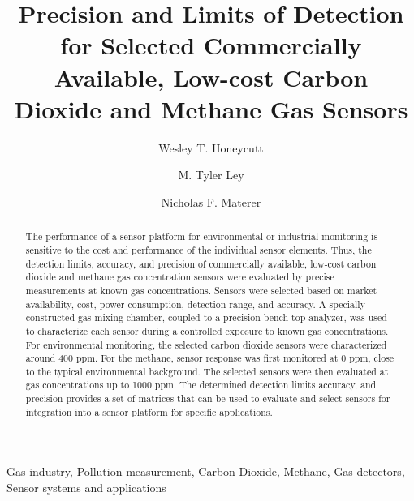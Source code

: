 \documentclass[preprint,sort&compress]{elsarticle}
\begin{document}
	
	\begin{frontmatter}
		\title{Precision and Limits of Detection for Selected Commercially Available, Low-cost Carbon Dioxide and Methane Gas Sensors}
		\author[chm]{Wesley T. Honeycutt}
		
		\author[cve]{M. Tyler Ley}	
		
		\author[chm]{Nicholas F. Materer}
		
		\address[chm]{Oklahoma State University, Department of Chemistry, 107 Physical Sciences, Stillwater, OK 74078, USA}
		\address[cve]{Oklahoma State University, Department of Civil Engineering, 319C Engineering South, Stillwater, OK 74078, USA}
		
		\begin{abstract} 
			
			The performance of a sensor platform for environmental or industrial monitoring is sensitive to the cost and performance of the individual sensor elements.
			Thus, the detection limits, accuracy, and precision of commercially available, low-cost carbon dioxide and methane gas concentration sensors were evaluated by precise measurements at known gas concentrations.
			Sensors were selected based on market availability, cost, power consumption, detection range, and accuracy.
			A specially constructed gas mixing chamber, coupled to a precision bench-top analyzer, was used to characterize each sensor during a controlled exposure to known gas concentrations.
			For environmental monitoring, the selected carbon dioxide sensors were characterized around 400 ppm.
			For the methane, sensor response was first monitored at 0 ppm, close to the typical environmental background.
			The selected sensors were then evaluated at gas concentrations up to 1000 ppm.
			The determined detection limits accuracy, and precision provides a set of matrices that can be used to evaluate and select sensors for integration into a sensor platform for specific applications.

			
		\end{abstract}
		
		\begin{keyword}
			Gas industry, Pollution measurement, Carbon Dioxide, Methane, Gas detectors, Sensor systems and applications
		\end{keyword}
		
	\end{frontmatter}
	
\end{document}

